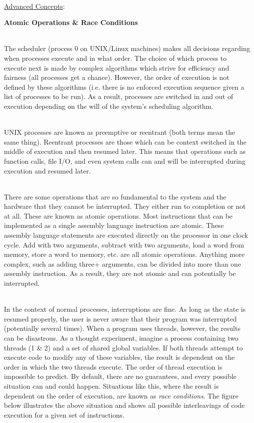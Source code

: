 \documentclass[12pt]{extarticle}
\newenvironment{myindentpar}[1]%
 {\begin{list}{}%
         {\setlength{\leftmargin}{#1}}%
         \item[]%
 }
 {\end{list}}
\begin{document}
\ \\
{\large \underline{Advanced Concepts}:}

\begin{myindentpar}{5mm}

    \noindent
    \textbf{Atomic Operations \& Race Conditions}
    
    \ \\
    The scheduler (process 0 on UNIX/Linux machines) makes all decisions regarding when processes execute and in what order.  The choice of which process to execute next is made by complex algorithms which strive for efficiency and fairness (all processes get a chance).  However, the order of execution is not defined by these algorithms (i.e. there is no enforced execution sequence given a list of processes to be run).  As a result, processes are switched in and out of execution depending on the will of the system's scheduling algorithm.  

    \ \\
    UNIX processes are known as preemptive or reentrant (both terms mean the same thing).  Reentrant processes are those which can be context switched in the middle of execution and then resumed later.  This means that operations such as function calls, file I/O, and even system calls can and will be interrupted during execution and resumed later.  
    
    \ \\
    There are some operations that are so fundamental to the system and the hardware that they cannot be interrupted.  They either run to completion or not at all.  These are known as atomic operations.  Most instructions that can be implemented as a single assembly language instruction are atomic.  These assembly language statements are executed directly on the processor in one clock cycle.  Add with two arguments, subtract with two arguments, load a word from memory, store a word to memory, etc. are all atomic operations.  Anything more complex, such as adding three+ arguments, can be divided into more than one assembly instruction.  As a result, they are not atomic and can potentially be interrupted.  
    
    \ \\
    In the context of normal processes, interruptions are fine.  As long as the state is resumed properly, the user is never aware that their program was interrupted (potentially several times).  When a program uses threads, however, the results can be disastrous.  As a thought experiment, imagine a process containing two threads (1 \& 2) and a set of shared global variables.  If both threads attempt to execute code to modify any of these variables, the result is dependent on the order in which the two threads execute.  The order of thread execution is impossible to predict.  By default, there are no guarantees, and every possible situation can and could happen.  Situations like this, where the result is dependent on the order of execution, are known as \emph{race conditions}.  The figure below illustrates the above situation and shows all possible interleavings of code execution for a given set of instructions.  
    

\end{myindentpar}
\end{document}
